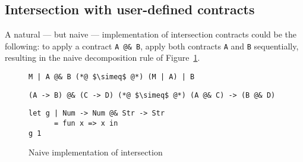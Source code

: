 \documentclass[sigplan,10pt,review,anonymous]{acmart}
\newcommand{\nickel}[1]{\lstinline[language=nickel]{#1}}
\begin{document}
%


\subsection{Intersection with user-defined contracts}
\label{sec:flat-and-inter}

A natural --- but naive --- implementation of intersection contracts could be the
following: to apply a contract \nickel{A @& B}, apply both contracts \nickel{A}
and \nickel{B} sequentially, resulting in the naive decomposition rule of
Figure~\ref{fig:naive-impl}.

\begin{figure}[h]
\begin{lstlisting}[language=nickel,frame=none,numbers=none,title={Naive
decomposition}]
M | A @& B (*@ $\simeq$ @*) (M | A) | B
\end{lstlisting}
\begin{lstlisting}[language=nickel,frame=none,numbers=none,title={Exchange law}]
(A -> B) @& (C -> D) (*@ $\simeq$ @*) (A @& C) -> (B @& D)
\end{lstlisting}
\begin{lstlisting}[language=nickel,title={Overloaded identity}]
let g | Num -> Num @& Str -> Str
      = fun x => x in
g 1
\end{lstlisting}
\caption{Naive implementation of intersection}
\label{fig:naive-impl}
\end{figure}
\end{document}
